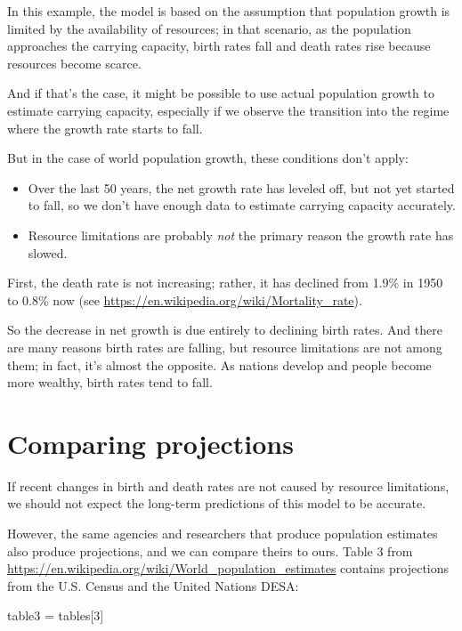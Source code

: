 \documentclass[12pt]{book}
\theoremstyle{exercise}
\begin{document}
In this example, the model is based on the assumption that population growth is limited by the availability of resources; in that scenario, as the population approaches the carrying capacity, birth rates fall and death rates rise because resources become scarce.

And if that's the case, it might be possible to use actual population growth to estimate carrying capacity, especially if we observe the transition into the regime where the growth rate starts to fall.

But in the case of world population growth, these conditions don't apply:

\begin{itemize}

\item Over the last 50 years, the net growth rate has leveled off, but not yet started to fall, so we don't have enough data to estimate carrying capacity accurately.

\item Resource limitations are probably {\em not} the primary reason the growth rate has slowed. 

\end{itemize} 

First, the death rate is not increasing; rather, it has declined from 1.9\% in 1950 to 0.8\% now (see \url{https://en.wikipedia.org/wiki/Mortality_rate}).

So the decrease in net growth is due entirely to declining birth rates.  And there are many reasons birth rates are falling, but resource limitations are not among them; in fact, it's almost the opposite.  As nations develop and people become more wealthy, birth rates tend to fall.  


\section{Comparing projections}

If recent changes in birth and death rates are not caused by resource limitations, we should not expect the long-term predictions of this model to be accurate.

However, the same agencies and researchers that produce population estimates also produce projections, and we can compare theirs to ours.  Table 3 from \url{https://en.wikipedia.org/wiki/World_population_estimates} contains projections from the U.S. Census and the United Nations DESA:

\begin{python}
table3 = tables[3]
\end{python}
\end{document}
